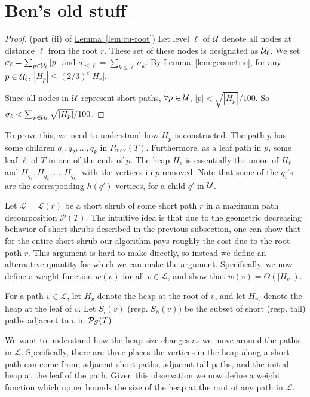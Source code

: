 \documentclass[11pt]{article}
\theoremstyle{definition}
\newcommand{\cU}{{\cal U}}
\newcommand{\Lem}[1]{\hyperref[lem:#1]{Lemma~\ref*{lem:#1}}} %
\newcommand{\pmax}{P_{\max}}
\begin{document}
\section{Ben's old stuff}



\begin{proof} (part (ii) of \Lem{cu-root}) Let level $\ell$ of $\cU$ denote all nodes at distance $\ell$ from the root $r$.
These set of these nodes is designated as $\cU_\ell$. We set $\sigma_\ell = \sum_{p \in \cU_\ell} |p|$
and $\sigma_{\leq \ell} = \sum_{k \leq \ell} \sigma_k$.
By \Lem{geometric}, for any $p \in \cU_\ell$, $|H_p| \leq (2/3)^\ell |H_r|$.

Since all nodes in $\cU$ represent short paths, $\forall p \in \cU$, $|p| < \sqrt{|H_p|}/100$.
So $\sigma_\ell < \sum_{p \in \cU_\ell} \sqrt{|H_p|}/100$. 

\end{proof}


To prove this, we need to understand how $H_p$ is constructed. The path $p$ has some children
$q_1, q_2, \ldots, q_k$ in $\pmax(T)$. Furthermore, as a leaf path in $p$, some leaf
$\ell$ of $T$ in one of the ends of $p$. The heap $H_p$ is essentially the
union of $H_\ell$ and $H_{q_1}, H_{q_2}, \ldots, H_{q_k}$, with the vertices in $p$
removed. Note that some of the $q_i$'s are the corresponding $h(q')$ vertices,
for a child $q'$ in $\cU$.


Let $\mathcal{L} = \mathcal{L}(r)$ be a short shrub of some short path $r$ in a maximum path decomposition $\mathcal{P}(T)$.
The intuitive idea is that due to the geometric decreasing behavior of short shrubs described in the previous subsection, 
one can show that for the entire short shrub our algorithm pays roughly the cost due to the root path $r$.  This argument 
is hard to make directly, so instead we define an alternative quantity for which we can make the argument.
Specifically, we now define a weight function $w(v)$ for all $v\in \mathcal{L}$, and show that $w(v)=\Theta(|H_v|)$.  

For a path $v\in \mathcal{L}$, let $H_v$ denote the heap at the root of $v$, and let $H_{v_f}$ denote the heap 
at the leaf of $v$.  Let $S_l(v)$ (resp. $S_h(v)$) be the subset of short (resp. tall) paths adjacent to $v$ in $\mathcal{P}_{\mathcal{S}}(T)$.

We want to understand how the heap size changes as we move around the paths in $\mathcal{L}$.  Specifically, there are 
three places the vertices in the heap along a short path can come from; adjacent short paths, adjacent tall paths, and the initial heap at the leaf of the path.  
Given this observation we now define a weight function which upper bounds the size of the heap at the root of any path in $\mathcal{L}$.
\end{document}
